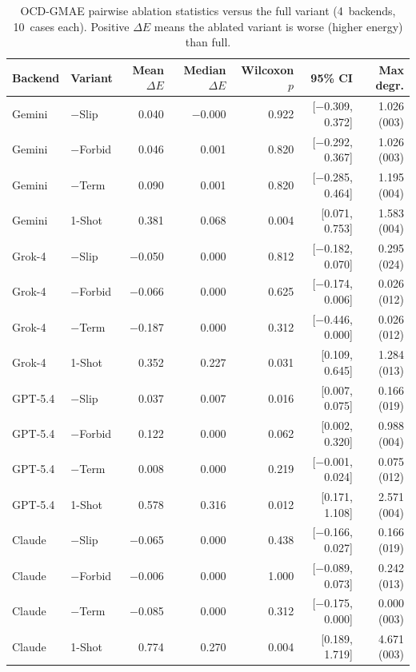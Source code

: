 \begin{table}[h]
\centering
\small
\caption{OCD-GMAE pairwise ablation statistics versus the full variant (4~backends, 10~cases each). Positive $\Delta E$ means the ablated variant is worse (higher energy) than full.}
\label{tab:si4-ocd-ablation-statistics}
\begin{tabular}{llrrrrr}
\toprule
Backend & Variant & Mean $\Delta E$ & Median $\Delta E$ & Wilcoxon $p$ & 95\% CI & Max degr. \\
\midrule
Gemini & $-$Slip & 0.040 & $-$0.000 & 0.922 & [$-$0.309, 0.372] & 1.026 (003) \\
Gemini & $-$Forbid & 0.046 & 0.001 & 0.820 & [$-$0.292, 0.367] & 1.026 (003) \\
Gemini & $-$Term & 0.090 & 0.001 & 0.820 & [$-$0.285, 0.464] & 1.195 (004) \\
Gemini & 1-Shot & 0.381 & 0.068 & 0.004 & [0.071, 0.753] & 1.583 (004) \\
\midrule
Grok-4 & $-$Slip & $-$0.050 & 0.000 & 0.812 & [$-$0.182, 0.070] & 0.295 (024) \\
Grok-4 & $-$Forbid & $-$0.066 & 0.000 & 0.625 & [$-$0.174, 0.006] & 0.026 (012) \\
Grok-4 & $-$Term & $-$0.187 & 0.000 & 0.312 & [$-$0.446, 0.000] & 0.026 (012) \\
Grok-4 & 1-Shot & 0.352 & 0.227 & 0.031 & [0.109, 0.645] & 1.284 (013) \\
\midrule
GPT-5.4 & $-$Slip & 0.037 & 0.007 & 0.016 & [0.007, 0.075] & 0.166 (019) \\
GPT-5.4 & $-$Forbid & 0.122 & 0.000 & 0.062 & [0.002, 0.320] & 0.988 (004) \\
GPT-5.4 & $-$Term & 0.008 & 0.000 & 0.219 & [$-$0.001, 0.024] & 0.075 (012) \\
GPT-5.4 & 1-Shot & 0.578 & 0.316 & 0.012 & [0.171, 1.108] & 2.571 (004) \\
\midrule
Claude & $-$Slip & $-$0.065 & 0.000 & 0.438 & [$-$0.166, 0.027] & 0.166 (019) \\
Claude & $-$Forbid & $-$0.006 & 0.000 & 1.000 & [$-$0.089, 0.073] & 0.242 (013) \\
Claude & $-$Term & $-$0.085 & 0.000 & 0.312 & [$-$0.175, 0.000] & 0.000 (003) \\
Claude & 1-Shot & 0.774 & 0.270 & 0.004 & [0.189, 1.719] & 4.671 (003) \\
\bottomrule
\end{tabular}
\end{table}
